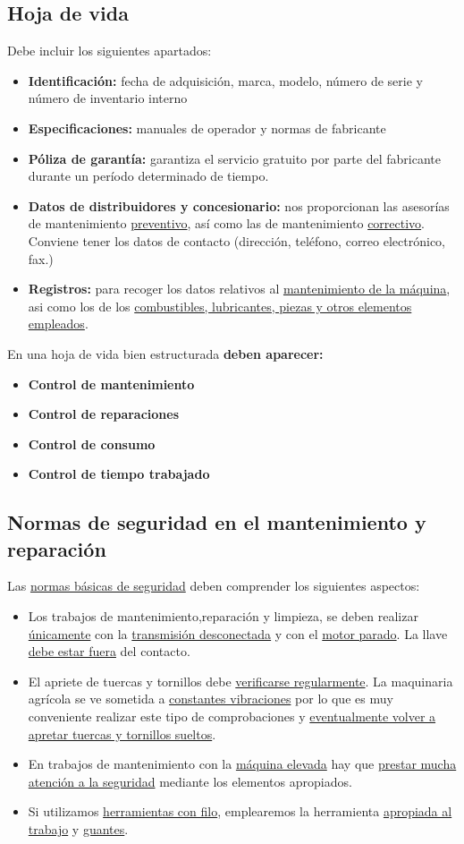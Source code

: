 \documentclass[a4paper,12pt,oneside]{book}
\begin{document}
\subsection{Hoja de vida}
\label{sec:orgbeed40c}
Debe incluir los siguientes apartados:
\begin{itemize}
\item \textbf{Identificación:} fecha de adquisición, marca, modelo, número de serie y
número de inventario interno
\item \textbf{Especificaciones:} manuales de operador y normas de fabricante
\item \textbf{Póliza de garantía:} garantiza el servicio gratuito por parte del fabricante
durante un período determinado de tiempo.
\item \textbf{Datos de distribuidores y concesionario:} nos proporcionan las asesorías de
mantenimiento \uline{preventivo}, así como las de mantenimiento
\uline{correctivo}. Conviene tener los datos de contacto (dirección, teléfono,
correo electrónico, fax.)
\item \textbf{Registros:} para recoger los datos relativos al \uline{mantenimiento de la
máquina}, asi como los de los \uline{combustibles, lubricantes, piezas y otros 
elementos empleados}.
\end{itemize}

En una hoja de vida bien estructurada \textbf{deben aparecer:}
\begin{itemize}
\item \textbf{Control de mantenimiento}
\item \textbf{Control de reparaciones}
\item \textbf{Control de consumo}
\item \textbf{Control de tiempo trabajado}
\end{itemize}

\subsection{Normas de seguridad en el mantenimiento y reparación}
\label{sec:orga179287}
Las \uline{normas básicas de seguridad} deben comprender los siguientes aspectos:
\begin{itemize}
\item Los trabajos de mantenimiento,reparación y limpieza, se deben realizar
\uline{únicamente} con la \uline{transmisión desconectada} y con el \uline{motor parado}. La
llave \uline{debe estar fuera} del contacto.
\item El apriete de tuercas y tornillos debe \uline{verificarse regularmente}. La
maquinaria agrícola se ve sometida a \uline{constantes vibraciones} por lo que es
muy conveniente realizar este tipo de comprobaciones y \uline{eventualmente volver a 
apretar tuercas y tornillos sueltos}.
\item En trabajos de mantenimiento con la \uline{máquina elevada} hay que \uline{prestar mucha 
atención a la seguridad} mediante los elementos apropiados.
\item Si utilizamos \uline{herramientas con filo}, emplearemos la herramienta \uline{apropiada 
al trabajo} y \uline{guantes}.
\end{itemize}
\end{document}
